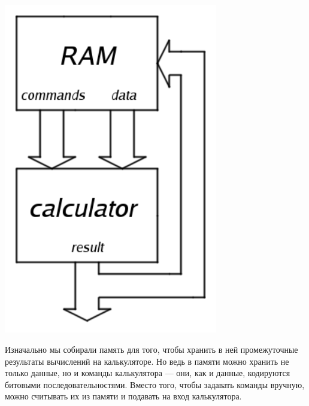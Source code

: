 \documentclass[11pt]{book}
\begin{document}
\\
\begin{minipage}{0.3\textwidth}
\centering
\includegraphics[width=0.7\textwidth]{pic/calculator_ram.png}
\end{minipage}
\begin{minipage}{0.7\textwidth}
Изначально мы собирали память для того, чтобы хранить в ней промежуточные результаты вычислений на калькуляторе.
Но ведь в памяти можно хранить не только данные, но и команды калькулятора ---
они, как и данные, кодируются битовыми последовательностями.
Вместо того, чтобы задавать команды вручную, можно считывать их из памяти и подавать на вход калькулятора.
\end{minipage}
\end{document}
